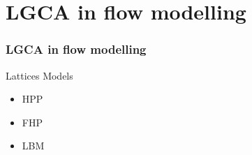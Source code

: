 \documentclass{beamer}
\begin{document}
	\section{LGCA in flow modelling}
	\begin{frame}
	\frametitle{LGCA in flow modelling}
	\centering
    \begin{block}{Lattices Models}
    \begin{itemize}
    \item HPP 
    \item FHP
    \item LBM
    \end{itemize}
    \end{block}
    \endminipage\hfill
	\end{frame}

\end{document}

